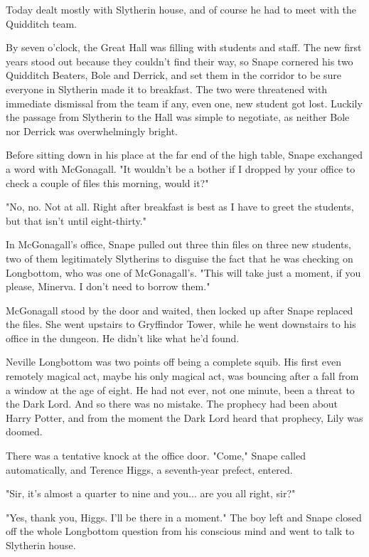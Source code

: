 \documentclass[a4paper,11pt]{article}
\begin{document}
Today dealt mostly with Slytherin house, and of course he had to meet with the Quidditch team.

By seven o'clock, the Great Hall was filling with students and staff. The new first years stood out because they couldn't find their way, so Snape cornered his two Quidditch Beaters, Bole and Derrick, and set them in the corridor to be sure everyone in Slytherin made it to breakfast. The two were threatened with immediate dismissal from the team if any, even one, new student got lost. Luckily the passage from Slytherin to the Hall was simple to negotiate, as neither Bole nor Derrick was overwhelmingly bright.

Before sitting down in his place at the far end of the high table, Snape exchanged a word with McGonagall. "It wouldn't be a bother if I dropped by your office to check a couple of files this morning, would it?"

"No, no. Not at all. Right after breakfast is best as I have to greet the students, but that isn't until eight-thirty."

In McGonagall's office, Snape pulled out three thin files on three new students, two of them legitimately Slytherins to disguise the fact that he was checking on Longbottom, who was one of McGonagall's. "This will take just a moment, if you please, Minerva. I don't need to borrow them."

McGonagall stood by the door and waited, then locked up after Snape replaced the files. She went upstairs to Gryffindor Tower, while he went downstairs to his office in the dungeon. He didn't like what he'd found.

Neville Longbottom was two points off being a complete squib. His first even remotely magical act, maybe his only magical act, was bouncing after a fall from a window at the age of eight. He had not ever, not one minute, been a threat to the Dark Lord. And so there was no mistake. The prophecy had been about Harry Potter, and from the moment the Dark Lord heard that prophecy, Lily was doomed.

There was a tentative knock at the office door. "Come," Snape called automatically, and Terence Higgs, a seventh-year prefect, entered.

"Sir, it's almost a quarter to nine and you... are you all right, sir?"

"Yes, thank you, Higgs. I'll be there in a moment." The boy left and Snape closed off the whole Longbottom question from his conscious mind and went to talk to Slytherin house.
\end{document}
